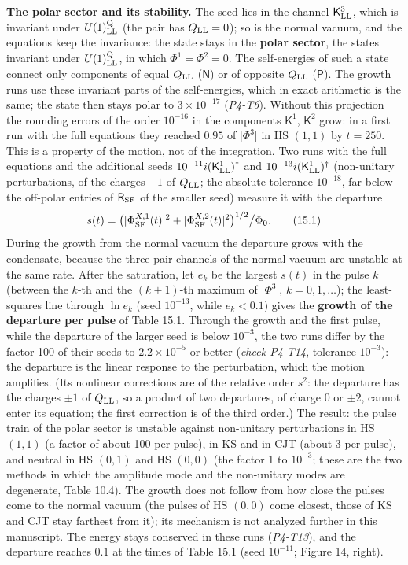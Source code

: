 \documentclass[
  10pt,
]{article}
\begin{document}
\textbf{The polar sector and its stability.} The seed lies in the
channel \(\mathsf K^3_{\rm LL}\), which is invariant under
\(U(1)^{\rm Q}_{\rm LL}\) (the pair has \(Q_{\rm LL}=0\)); so is the
normal vacuum, and the equations keep the invariance: the state stays in
the \textbf{polar sector}, the states invariant under
\(U(1)^{\rm Q}_{\rm LL}\), in which \(\Phi^1=\Phi^2=0\). The
self-energies of such a state connect only components of equal
\(Q_{\rm LL}\) (\(\mathsf N\)) or of opposite \(Q_{\rm LL}\)
(\(\mathsf P\)). The growth runs use these invariant parts of the
self-energies, which in exact arithmetic is the same; the state then
stays polar to \(3\times10^{-17}\) (\emph{P4-T6}). Without this
projection the rounding errors of the order \(10^{-16}\) in the
components \(\mathsf K^1\), \(\mathsf K^2\) grow: in a first run with
the full equations they reached \(0.95\) of \(\lvert\Phi^3\rvert\) in HS
\((1,1)\) by \(t=250\). This is a property of the motion, not of the
integration. Two runs with the full equations and the additional seeds
\(10^{-11}i(\mathsf K^1_{\rm LL})^\dagger\) and
\(10^{-13}i(\mathsf K^1_{\rm LL})^\dagger\) (non-unitary perturbations,
of the charges \(\pm1\) of \(Q_{\rm LL}\); the absolute tolerance
\(10^{-18}\), far below the off-polar entries of \(\mathsf R_{\rm SF}\)
of the smaller seed) measure it with the departure
\[s(t)=\big(\lvert\Phi^{X,1}_{\rm SF}(t)\rvert^2+\lvert\Phi^{X,2}_{\rm SF}(t)\rvert^2\big)^{1/2}\big/\Phi_0.\tag{15.1}\]
During the growth from the normal vacuum the departure grows with the
condensate, because the three pair channels of the normal vacuum are
unstable at the same rate. After the saturation, let \(e_k\) be the
largest \(s(t)\) in the pulse \(k\) (between the \(k\)-th and the
\((k+1)\)-th maximum of \(\lvert\Phi^3\rvert\), \(k=0,1,\dots\)); the
least-squares line through \(\ln e_k\) (seed \(10^{-13}\), while
\(e_k<0.1\)) gives the \textbf{growth of the departure per pulse} of
Table 15.1. Through the growth and the first pulse, while the departure
of the larger seed is below \(10^{-3}\), the two runs differ by the
factor 100 of their seeds to \(2.2\times10^{-5}\) or better (\emph{check
P4-T14}, tolerance \(10^{-3}\)): the departure is the linear response to
the perturbation, which the motion amplifies. (Its nonlinear corrections
are of the relative order \(s^2\): the departure has the charges
\(\pm1\) of \(Q_{\rm LL}\), so a product of two departures, of charge 0
or \(\pm2\), cannot enter its equation; the first correction is of the
third order.) The result: the pulse train of the polar sector is
unstable against non-unitary perturbations in HS \((1,1)\) (a factor of
about 100 per pulse), in KS and in CJT (about 3 per pulse), and neutral
in HS \((0,1)\) and HS \((0,0)\) (the factor 1 to \(10^{-3}\); these are
the two methods in which the amplitude mode and the non-unitary modes
are degenerate, Table 10.4). The growth does not follow from how close
the pulses come to the normal vacuum (the pulses of HS \((0,0)\) come
closest, those of KS and CJT stay farthest from it); its mechanism is
not analyzed further in this manuscript. The energy stays conserved in
these runs (\emph{P4-T13}), and the departure reaches \(0.1\) at the
times of Table 15.1 (seed \(10^{-11}\); Figure 14, right).
\end{document}
